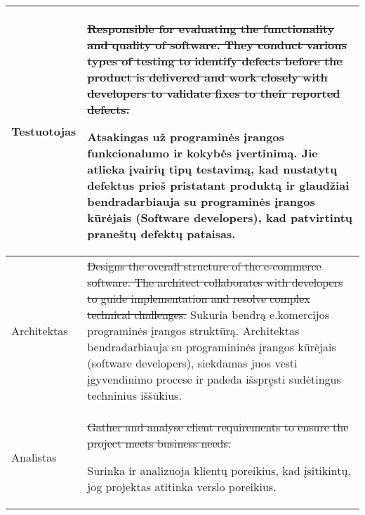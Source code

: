 \begin{table}[h!]
\begin{tabular}{p{}|p{}}
Testuotojas & \st{Responsible for evaluating the functionality and quality of software. They conduct various types of testing to identify defects before the product is delivered and work closely with developers to validate fixes to their reported defects. }


Atsakingas už programinės įrangos funkcionalumo ir kokybės įvertinimą. Jie atlieka įvairių tipų testavimą, kad nustatytų defektus prieš pristatant produktą ir glaudžiai bendradarbiauja su programinės įrangos kūrėjais (Software developers), kad patvirtintų praneštų defektų pataisas.
\\ \hline

Architektas & \st{Designs the overall structure of the e-commerce software. The architect collaborates with developers to guide implementation and resolve complex technical challenges. }
Sukuria bendrą e.komercijos programinės įrangos struktūrą. Architektas bendradarbiauja su programininės
įrangos kūrėjais (software developers), siekdamas juos vesti įgyvendinimo procese ir padeda išspręsti sudėtingus techninius iššūkius.

\\ \hline
Analistas &  \st{Gather and analyse client requirements to ensure the project meets business needs.}

Surinka ir analizuoja klientų poreikius, kad įsitikintų, jog projektas atitinka verslo poreikius.
\\ \hline


\end{tabular}
\end{table}




